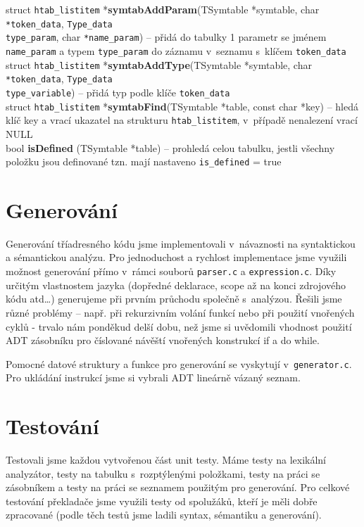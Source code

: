 \documentclass[11pt,a4paper]{article}
\begin{document}
\noindent
struct \verb|htab_listitem| *\textbf{symtabAddParam}(TSymtable *symtable, char \verb|*token_data|, \verb|Type_data| \\ \verb|type_param|, char \verb|*name_param|) -- přidá do tabulky 1 parametr se jménem \verb|name_param| a typem \verb|type_param| do záznamu v~seznamu s~klíčem \verb|token_data| \\


\noindent
struct \verb|htab_listitem| *\textbf{symtabAddType}(TSymtable *symtable, char \verb|*token_data|, \verb|Type_data| \\ \verb|type_variable|) -- přidá typ podle klíče \verb|token_data| \\


\noindent
struct \verb|htab_listitem| *\textbf{symtabFind}(TSymtable *table, const char *key) -- hledá klíč key a vrací ukazatel na strukturu \verb|htab_listitem|, v~případě nenalezení vrací NULL \\


\noindent
bool \textbf{isDefined} (TSymtable *table) -- prohledá celou tabulku, jestli všechny položku jsou definované tzn. mají nastaveno \verb|is_defined| = true \\



\section{Generování}
Generování tříadresného kódu jsme implementovali v~návaznosti na syntaktickou a sémantickou analýzu. Pro jednoduchost a rychlost implementace jsme využili možnost generování přímo v~rámci souborů \verb|parser.c| a \verb|expression.c|. Díky určitým vlastnostem jazyka (dopředné deklarace, scope až na konci zdrojového kódu atd\dots) generujeme při prvním průchodu společně s~analýzou. Řešili jsme různé problémy -- např. při rekurzivním volání funkcí nebo při použití vnořených cyklů - trvalo nám ponděkud delší dobu, než jsme si uvědomili vhodnost použití ADT zásobníku pro číslované návěští vnořených konstrukcí if a do while.

Pomocné datové struktury a funkce pro generování se vyskytují v~\verb|generator.c|. Pro ukládání instrukcí jsme si vybrali ADT lineárně vázaný seznam.


\section{Testování}
Testovali jsme každou vytvořenou část unit testy. Máme testy na lexikální analyzátor, testy na tabulku s~rozptýlenými položkami, testy na práci se zásobníkem a testy na práci se seznamem použitým pro generování. Pro celkové testování překladače jsme využili testy od spolužáků, kteří je měli dobře zpracované (podle těch testů jsme ladili syntax, sémantiku a generování). 
\end{document}

